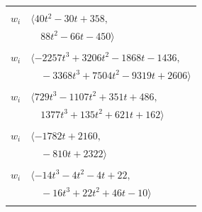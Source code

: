 \documentclass[11pt]{article}
\begin{document}
\begin{longtable}{@{}ll@{}}
\addlinespace[2pt]
\multicolumn{2}{@{}p{0.97\textwidth}@{}}{$i=49$, $D_i=2$, $\rho_{ij}$: $23{:}2, \allowbreak 25{:}1, \allowbreak 39{:}1, \allowbreak 42{:}1, \allowbreak 47{:}1, \allowbreak 55{:}1, \allowbreak 57{:}2, \allowbreak 61{:}1, \allowbreak 64{:}2$}\\
$w_i$ & $\langle 40t^{2}-30t+358,$\\
 & $\quad 88t^{2}-66t-450\rangle$\\
\addlinespace[2pt]
\multicolumn{2}{@{}p{0.97\textwidth}@{}}{$i=50$, $D_i=8$, $\rho_{ij}$: $2{:}2, \allowbreak 3{:}1, \allowbreak 8{:}1, \allowbreak 9{:}1, \allowbreak 15{:}1, \allowbreak 29{:}1, \allowbreak 34{:}2, \allowbreak 47{:}1, \allowbreak 48{:}2, \allowbreak 55{:}1, \allowbreak 56{:}1, \allowbreak 58{:}2, \allowbreak 59{:}2$}\\
$w_i$ & $\langle -2257t^{3}+3206t^{2}-1868t-1436,$\\
 & $\quad -3368t^{3}+7504t^{2}-9319t+2606\rangle$\\
\addlinespace[2pt]
\multicolumn{2}{@{}p{0.97\textwidth}@{}}{$i=51$, $D_i=18$, $e_i=1$, $\rho_{ij}$: $9{:}2, \allowbreak 12{:}2, \allowbreak 48{:}2, \allowbreak 68{:}2, \allowbreak 72{:}1, \allowbreak 73{:}1$}\\
$w_i$ & $\langle 729t^{3}-1107t^{2}+351t+486,$\\
 & $\quad 1377t^{3}+135t^{2}+621t+162\rangle$\\
\addlinespace[2pt]
\multicolumn{2}{@{}p{0.97\textwidth}@{}}{$i=52$, $D_i=54$, $e_i=0$, $\rho_{ij}$: $2{:}1, \allowbreak 13{:}1, \allowbreak 19{:}1, \allowbreak 47{:}2, \allowbreak 53{:}2, \allowbreak 62{:}2$}\\
$w_i$ & $\langle -1782t+2160,$\\
 & $\quad -810t+2322\rangle$\\
\addlinespace[2pt]
\multicolumn{2}{@{}p{0.97\textwidth}@{}}{$i=53$, $D_i=2$, $\rho_{ij}$: $6{:}1, \allowbreak 10{:}2, \allowbreak 17{:}2, \allowbreak 35{:}2, \allowbreak 52{:}1, \allowbreak 54{:}2, \allowbreak 60{:}2, \allowbreak 63{:}2, \allowbreak 66{:}1$}\\
$w_i$ & $\langle -14t^{3}-4t^{2}-4t+22,$\\
 & $\quad -16t^{3}+22t^{2}+46t-10\rangle$\\
\addlinespace[2pt]
\multicolumn{2}{@{}p{0.97\textwidth}@{}}{$i=54$, $D_i=4$, $\rho_{ij}$: $13{:}2, \allowbreak 29{:}2, \allowbreak 36{:}2, \allowbreak 39{:}1, \allowbreak 47{:}2, \allowbreak 53{:}1, \allowbreak 57{:}1, \allowbreak 58{:}1, \allowbreak 64{:}2$}\\

\end{longtable}
\end{document}
